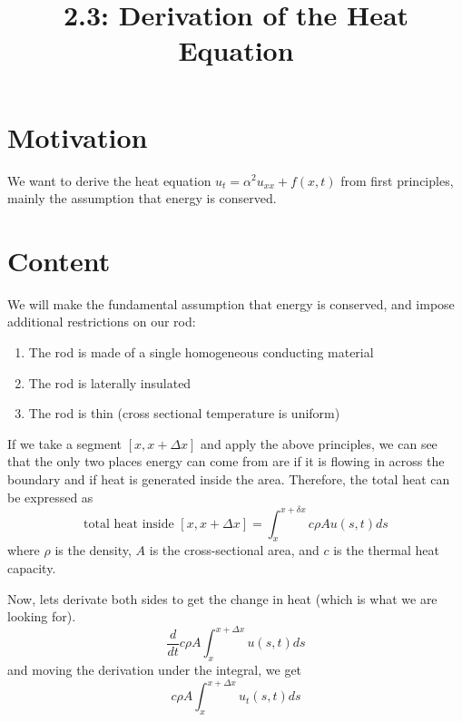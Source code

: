 \documentclass{article}
\title{2.3: Derivation of the Heat Equation}
\begin{document}
\maketitle

\section{Motivation}

We want to derive the heat equation $u_t = \alpha^2u_{xx} + f(x,t)$ from first principles, mainly the assumption that energy is conserved.

\section{Content}

We will make the fundamental assumption that energy is conserved, and impose additional restrictions on our rod:

\begin{enumerate}
    \item The rod is made of a single homogeneous conducting material
    \item The rod is laterally insulated
    \item The rod is thin (cross sectional temperature is uniform)
\end{enumerate}

If we take a segment $[x,x+\Delta x]$ and apply the above principles, we can see that the only two places energy can come from are if it is flowing in across the boundary and if heat is generated inside the area. Therefore, the total heat can be expressed as $$\text{total heat inside $[x,x + \Delta x]$} = \int_{x}^{x + \delta x} c\rho A u(s,t) ds$$where $\rho$ is the density, $A$ is the cross-sectional area, and $c$ is the thermal heat capacity. 

Now, lets derivate both sides to get the change in heat (which is what we are looking for). $$\frac{d}{dt} c\rho A \int_x^{x+\Delta x} u(s,t) ds$$and moving the derivation under the integral, we get $$c\rho A \int_{x}^{x+\Delta x}u_t(s,t)ds$$
\end{document}
